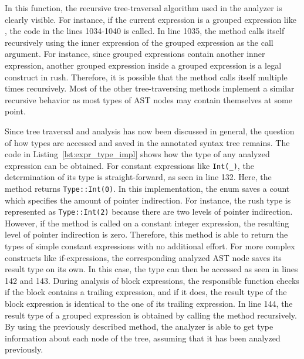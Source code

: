 In this function, the recursive tree-traversal algorithm used in the analyzer is clearly visible.
For instance, if the current expression is a grouped expression like , the code in the lines 1034-1040 is called.
In line 1035, the  method calls itself recursively using the inner expression of the grouped expression as the call argument.
For instance, since grouped expressions contain another inner expression, another grouped expression inside a grouped expression is a legal construct in rush.
Therefore, it is possible that the  method calls itself multiple times recursively.
Most of the other tree-traversing methods implement a similar recursive behavior as most types of AST nodes may contain themselves at some point.


Since tree traversal and analysis has now been discussed in general, the question of how types are accessed and saved in the annotated syntax tree remains.
The code in Listing~\ref{lst:expr_type_impl} shows how the type of any analyzed expression can be obtained.
For constant expressions like \verb|Int(_)|, the determination of its type is straight-forward, as seen in line 132.
Here, the  method returns \verb|Type::Int(0)|.
In this implementation, the  enum saves a count which specifies the amount of pointer indirection.
For instance, the rush type  is represented as \verb|Type::Int(2)| because there are two levels of pointer indirection.
However, if the method is called on a constant integer expression, the resulting level of pointer indirection is zero.
Therefore, this method is able to return the types of simple constant expressions with no additional effort.
For more complex constructs like if-expressions, the corresponding analyzed AST node saves its result type on its own.
In this case, the type can then be accessed as seen in lines 142 and 143.
During analysis of block expressions, the responsible function checks if the block contains a trailing expression,
and if it does, the result type of the block expression is identical to the one of its trailing expression.
In line 144, the result type of a grouped expression is obtained by calling the  method recursively.
By using the previously described method, the analyzer is able to get type information about each node of the tree, assuming that it has been analyzed previously.

